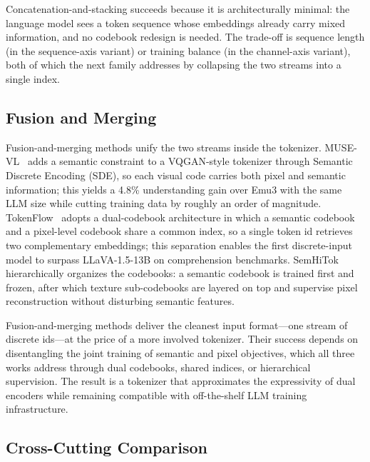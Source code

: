 Concatenation-and-stacking succeeds because it is architecturally minimal: the language model sees a token sequence whose embeddings already carry mixed information, and no codebook redesign is needed. The trade-off is sequence length (in the sequence-axis variant) or training balance (in the channel-axis variant), both of which the next family addresses by collapsing the two streams into a single index.

\subsection{Fusion and Merging}
\label{subsec:fusion-merging}

Fusion-and-merging methods unify the two streams inside the tokenizer. MUSE-VL~\cite{DBLP:conf/iccv/XieDSL25} adds a semantic constraint to a VQGAN-style tokenizer through Semantic Discrete Encoding (SDE), so each visual code carries both pixel and semantic information; this yields a 4.8\% understanding gain over Emu3 with the same LLM size while cutting training data by roughly an order of magnitude. TokenFlow~\cite{DBLP:conf/cvpr/QuZLWJGYDYW25} adopts a dual-codebook architecture in which a semantic codebook and a pixel-level codebook share a common index, so a single token id retrieves two complementary embeddings; this separation enables the first discrete-input model to surpass LLaVA-1.5-13B on comprehension benchmarks. SemHiTok~\cite{Chen202517811} hierarchically organizes the codebooks: a semantic codebook is trained first and frozen, after which texture sub-codebooks are layered on top and supervise pixel reconstruction without disturbing semantic features.

Fusion-and-merging methods deliver the cleanest input format---one stream of discrete ids---at the price of a more involved tokenizer. Their success depends on disentangling the joint training of semantic and pixel objectives, which all three works address through dual codebooks, shared indices, or hierarchical supervision. The result is a tokenizer that approximates the expressivity of dual encoders while remaining compatible with off-the-shelf LLM training infrastructure.

\subsection{Cross-Cutting Comparison}
\label{subsec:hybrid-comparison}

